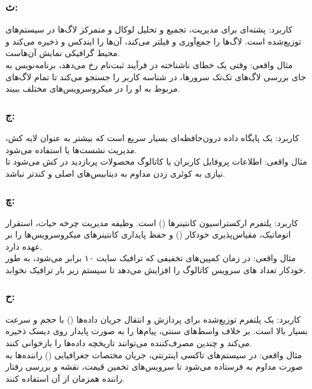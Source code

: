 \subsubsection*{ث: }
{کاربرد:} پشته‌ای برای مدیریت، تجمیع و تحلیل لوکال و متمرکز لاگ‌ها در سیستم‌های توزیع‌شده است.  لاگ‌ها را جمع‌آوری و فیلتر می‌کند،  آن‌ها را ایندکس و ذخیره می‌کند و  محیط گرافیکی نمایش آن‌هاست. \\
{مثال واقعی:} وقتی یک خطای ناشناخته در فرآیند ثبت‌نام رخ می‌دهد، برنامه‌نویس به جای بررسی لاگ‌های تک‌تک سرورها، در  شناسه کاربر را جستجو می‌کند تا تمام لاگ‌های مربوط به او را در میکروسرویس‌های مختلف ببیند.

\pagebreak

\subsubsection*{ج: }
{کاربرد:} یک پایگاه داده درون‌حافظه‌ای بسیار سریع است که بیشتر به عنوان لایه کش، مدیریت نشست‌ها یا  استفاده می‌شود. \\
{مثال واقعی:} اطلاعات پروفایل کاربران یا کاتالوگ محصولات پربازدید در  کش می‌شود تا نیازی به کوئری زدن مداوم به دیتابیس‌های اصلی و کندتر نباشد.

\subsubsection*{چ: }
{کاربرد:} پلتفرم ارکستراسیون کانتینرها () است. وظیفه مدیریت چرخه حیات، استقرار اتوماتیک، مقیاس‌پذیری خودکار () و حفظ پایداری کانتینرهای میکروسرویس‌ها را بر عهده دارد. \\
{مثال واقعی:} در زمان کمپین‌های تخفیفی که ترافیک سایت ۱۰ برابر می‌شود،  به طور خودکار تعداد های سرویس کاتالوگ را افزایش می‌دهد تا سیستم زیر بار ترافیک نخوابد.

\subsubsection*{ح: }
{کاربرد:} یک پلتفرم توزیع‌شده برای پردازش و انتقال جریان داده‌ها () با حجم و سرعت بسیار بالا است. بر خلاف واسط‌های سنتی، پیام‌ها را به صورت پایدار روی دیسک ذخیره می‌کند و چندین مصرف‌کننده می‌توانند تاریخچه داده‌ها را بازخوانی کنند. \\
{مثال واقعی:} در سیستم‌های تاکسی اینترنتی، جریان مختصات جغرافیایی () راننده‌ها به صورت مداوم به  فرستاده می‌شود تا سرویس‌های تخمین قیمت، نقشه و بررسی رفتار راننده همزمان از آن استفاده کنند.

